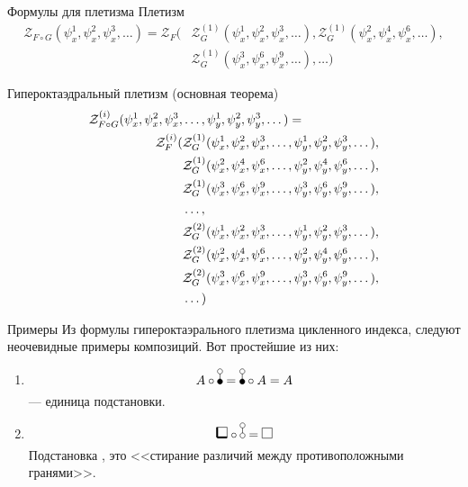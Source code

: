 \documentclass{beamer}
\begin{document}
\begin{frame}{Формулы для плетизма}
Плетизм
\begin{equation*}
\begin{split}
	\mathcal Z_{F \circ G} (\psi_x^1, \psi_x^2, \psi_x^3, \dots ) = \mathcal Z_F(
		&\mathcal Z^{(1)}_G(\psi_x^1, \psi_x^2, \psi_x^3, \dots), 
		\mathcal Z^{(1)}_G(\psi_x^2, \psi_x^4, \psi_x^6, \dots), \\ 
		&\mathcal Z^{(1)}_G(\psi_x^3, \psi_x^6, \psi_x^9, \dots), 
		\dots)
\end{split}
\end{equation*}

Гипероктаэдральный плетизм (основная теорема)
\begin{equation}
\begin{split}
\label{eq:h-zfg}
	\mathcal Z^{(i)}_{F \circ G} (\psi_x^1, \psi_x^2, \psi_x^3, &\dots, 
	\psi_y^1, \psi_y^2, \psi_y^3, \dots) = \\
	\mathcal Z_F^{(i)}(
		&\mathcal Z^{(1)}_G(\psi_x^1, \psi_x^2, \psi_x^3, \dots, 
					 \psi_y^1, \psi_y^2, \psi_y^3, \dots), \\
		&\mathcal Z^{(1)}_G(\psi_x^2, \psi_x^4, \psi_x^6, \dots, 
					 \psi_y^2, \psi_y^4, \psi_y^6, \dots), \\
		&\mathcal Z^{(1)}_G(\psi_x^3, \psi_x^6, \psi_x^9, \dots, 
					 \psi_y^3, \psi_y^6, \psi_y^9, \dots), \\
		&\dots, \\
		&\mathcal Z^{(2)}_G(\psi_x^1, \psi_x^2, \psi_x^3, \dots, 
					 \psi_y^1, \psi_y^2, \psi_y^3, \dots), \\
		&\mathcal Z^{(2)}_G(\psi_x^2, \psi_x^4, \psi_x^6, \dots, 
					 \psi_y^2, \psi_y^4, \psi_y^6, \dots), \\
		&\mathcal Z^{(2)}_G(\psi_x^3, \psi_x^6, \psi_x^9, \dots, 
					 \psi_y^3, \psi_y^6, \psi_y^9, \dots), \\
		&\dots
	)
\end{split}	
\end{equation}
\end{frame}

\begin{frame}{Примеры}
Из формулы гипероктаэрального плетизма цикленного индекса, следуют
неочевидные примеры композиций. Вот простейшие из них:
\begin{enumerate}[(1)]
\item
$$A \circ \dB = \dB \circ A = A$$
\dB --- единица подстановки.
\item
$$\dBB \circ \dA = \dAA$$
Подстановка \dA, это <<стирание различий между противоположными
гранями>>.
\end{enumerate}
\end{frame}
\end{document}
